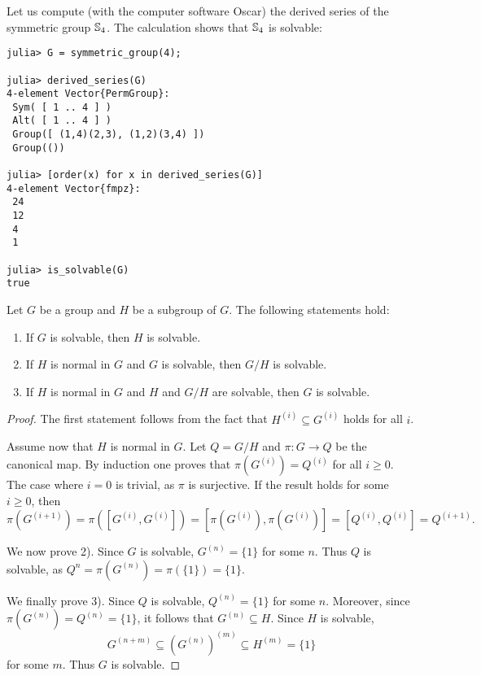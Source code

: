 Let us compute (with the computer software Oscar) 
the derived series of the symmetric group
$\mathbb{S}_4$. The calculation shows that $\mathbb{S}_4$ is solvable: 
\begin{lstlisting}
julia> G = symmetric_group(4);

julia> derived_series(G)
4-element Vector{PermGroup}:
 Sym( [ 1 .. 4 ] )
 Alt( [ 1 .. 4 ] )
 Group([ (1,4)(2,3), (1,2)(3,4) ])
 Group(())
 
julia> [order(x) for x in derived_series(G)]
4-element Vector{fmpz}:
 24
 12
 4
 1
 
julia> is_solvable(G)
true
\end{lstlisting}

\begin{proposition}
\label{pro:solvable}
    Let $G$ be a group and $H$ be a subgroup of $G$. 
    The following statements hold:
    \begin{enumerate}
        \item If $G$ is solvable, then $H$ is solvable.
        \item If $H$ is normal in $G$ and $G$ is solvable, then $G/H$ is solvable. 
        \item If $H$ is normal in $G$ and $H$ and $G/H$ are solvable, then $G$ is solvable. 
    \end{enumerate}
\end{proposition}

\begin{proof}
    The first statement follows from the fact that
    $H^{(i)}\subseteq G^{(i)}$ holds for all $i$. 
 
    Assume now that $H$ is normal in $G$. 
    Let $Q=G/H$ and $\pi\colon G\to Q$ be the canonical map.
    By induction one proves that $\pi(G^{(i)})=Q^{(i)}$ for all $i\geq0$.
    The case where $i=0$ is trivial, as $\pi$ is surjective. 
    If the result holds for some $i\geq0$, then
    \[
            \pi(G^{(i+1)})=\pi([G^{(i)},G^{(i)}])=[\pi(G^{(i)}),\pi(G^{(i)})]=[Q^{(i)},Q^{(i)}]=Q^{(i+1)}.
    \]

    We now prove 2). Since $G$ is solvable, $G^{(n)}=\{1\}$ for some $n$. 
    Thus $Q$ is solvable, as $Q^{n}=\pi(G^{(n)})=\pi(\{1\})=\{1\}$. 

    We finally prove 3). 
    Since $Q$ is solvable, $Q^{(n)}=\{1\}$ for some $n$.
    Moreover, since $\pi(G^{(n)})=Q^{(n)}=\{1\}$, it follows that
    $G^{(n)}\subseteq H$. Since $H$
    is solvable, 
    \[
        G^{(n+m)}\subseteq (G^{(n)})^{(m)}\subseteq H^{(m)}=\{1\}
    \]
    for some $m$. Thus $G$ is solvable.
\end{proof}

